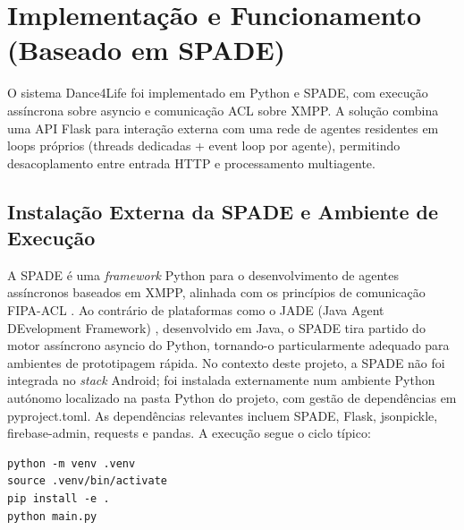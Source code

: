 \documentclass[runningheads]{llncs}
\begin{document}
\section{Implementação e Funcionamento (Baseado em SPADE)}
O sistema Dance4Life foi implementado em Python e SPADE, com execução assíncrona sobre asyncio e comunicação ACL sobre XMPP. A solução combina uma API Flask para interação externa com uma rede de agentes residentes em loops próprios (threads dedicadas + event loop por agente), permitindo desacoplamento entre entrada HTTP e processamento multiagente. 

\subsection{Instalação Externa da SPADE e Ambiente de Execução}
A SPADE é uma \textit{framework} Python para o desenvolvimento de agentes assíncronos baseados em XMPP, alinhada com os princípios de comunicação FIPA-ACL \cite{asmnormas}. Ao contrário de plataformas como o JADE (Java Agent DEvelopment Framework) \cite{agentesinteligentes}, desenvolvido em Java, o SPADE tira partido do motor assíncrono asyncio do Python, tornando-o particularmente adequado para ambientes de prototipagem rápida. No contexto deste projeto, a SPADE não foi integrada no \textit{stack} Android; foi instalada externamente num ambiente Python autónomo localizado na pasta Python do projeto, com gestão de dependências em pyproject.toml. 
As dependências relevantes incluem SPADE, Flask, jsonpickle, firebase-admin, requests e pandas. A execução segue o ciclo típico: 
\begin{lstlisting}
python -m venv .venv
source .venv/bin/activate
pip install -e .
python main.py
\end{lstlisting}
\end{document}

